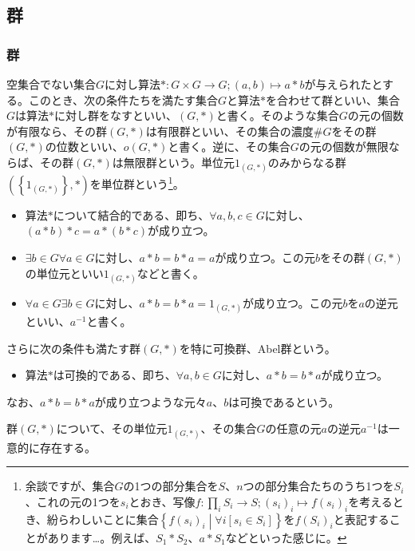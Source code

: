 \documentclass[dvipdfmx]{jsarticle}
\begin{document}
\subsection{群}%
\subsubsection{群}%
\begin{axs}[群の公理]
空集合でない集合$G$に対し算法$*:G \times G \rightarrow G;(a,b) \mapsto a*b$が与えられたとする。このとき、次の条件たちを満たす集合$G$と算法$*$を合わせて群といい、集合$G$は算法$*$に対し群をなすといい、$(G,*)$と書く。そのような集合$G$の元の個数が有限なら、その群$(G,*)$は有限群といい、その集合の濃度$\#G$をその群$(G,*)$の位数といい、$o(G,*)$と書く。逆に、その集合$G$の元の個数が無限ならば、その群$(G,*)$は無限群という。単位元$1_{(G,*)}$のみからなる群$\left( \left\{ 1_{(G,*)} \right\},* \right)$を単位群という\footnote{余談ですが、集合$G$の1つの部分集合を$S$、$n$つの部分集合たちのうち1つを$S_{i}$、これの元の1つを$s_{i}$とおき、写像$f:\prod_{i} S_{i} \rightarrow S;\left( s_{i} \right)_{i} \mapsto f\left( s_{i} \right)_{i}$を考えるとき、紛らわしいことに集合$\left\{ f\left( s_{i} \right)_{i} \middle| \forall i\left\lbrack s_{i} \in S_{i} \right\rbrack \right\}$を$f\left( S_{i} \right)_{i}$と表記することがあります…。例えば、$S_{1}*S_{2}$、$a*S_{1}$などといった感じに。}。
\begin{itemize}
\item
  算法$*$について結合的である、即ち、$\forall a,b,c \in G$に対し、$(a*b)*c = a*(b*c)$が成り立つ。
\item
  $\exists b \in G\forall a \in G$に対し、$a*b = b*a = a$が成り立つ。この元$b$をその群$(G,*)$の単位元といい$1_{(G,*)}$などと書く。
\item
  $\forall a \in G\exists b \in G$に対し、$a*b = b*a = 1_{(G,*)}$が成り立つ。この元$b$を$a$の逆元といい、$a^{- 1}$と書く。
\end{itemize}
さらに次の条件も満たす群$(G,*)$を特に可換群、Abel群という。
\begin{itemize}
\item
  算法$*$は可換的である、即ち、$\forall a,b \in G$に対し、$a*b = b*a$が成り立つ。
\end{itemize}
なお、$a*b = b*a$が成り立つような元々$a$、$b$は可換であるという。
\end{axs}
\begin{thm}\label{3.1.1.1}
群$(G,*)$について、その単位元$1_{(G,*)}$、その集合$G$の任意の元$a$の逆元$a^{- 1}$は一意的に存在する。
\end{thm}\par
\end{document}
